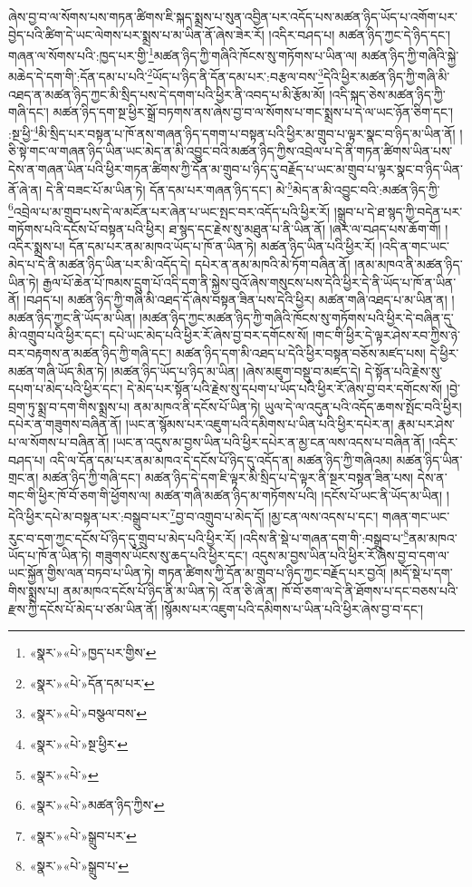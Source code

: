 ཞེས་བྱ་བ་ལ་སོགས་པས་གཏན་ཚིགས་ཇི་སྐད་སྨྲས་པ་སུན་འབྱིན་པར་འདོད་པས་མཚན་ཉིད་ཡོད་པ་འགོག་པར་བྱེད་པའི་ཚིག་དེ་ཡང་ལེགས་པར་སྨྲས་པ་མ་ཡིན་ནོ་ཞེས་ཟེར་རོ། །འདིར་བཤད་པ། མཚན་ཉིད་ཀྱང་དེ་ཉིད་དང་། གཞན་ལ་སོགས་པའི་:ཁྱད་པར་གྱི་\footnote{«སྣར་»«པེ་»ཁྱད་པར་གྱིས་}མཚན་ཉིད་ཀྱི་གཞིའི་ཁོངས་སུ་གཏོགས་པ་ཡིན་ལ། མཚན་ཉིད་ཀྱི་གཞིའི་སྐྱེ་མཆེད་དེ་དག་གི་:དོན་དམ་པ་པའི་\footnote{«སྣར་»«པེ་»དོན་དམ་པར་}ཡོད་པ་ཉིད་ནི་དོན་དམ་པར་:བརྩལ་བས་\footnote{«སྣར་»«པེ་»བསྩལ་བས་}དེའི་ཕྱིར་མཚན་ཉིད་ཀྱི་གཞི་མི་འཐད་ན་མཚན་ཉིད་ཀྱང་མི་སྲིད་པས་དེ་དགག་པའི་ཕྱིར་ནི་འབད་པ་མི་རྩོམ་མོ། །འདི་སྐད་ཅེས་མཚན་ཉིད་ཀྱི་གཞི་དང་། མཚན་ཉིད་དག་སྔ་ཕྱིར་སྒྲོ་བཏགས་ནས་ཞེས་བྱ་བ་ལ་སོགས་པ་གང་སྨྲས་པ་དེ་ལ་ཡང་ཉོན་ཅིག་དང་། :སྔ་ཕྱི་\footnote{«སྣར་»«པེ་»སྔ་ཕྱིར་}མི་སྲིད་པར་བསྟན་པ་ཁོ་ནས་གཞན་ཉིད་དགག་པ་བསྟན་པའི་ཕྱིར་མ་གྲུབ་པ་ལྟར་སྣང་བ་ཉིད་མ་ཡིན་ནོ། །ཅི་སྟེ་གང་ལ་གཞན་ཉིད་ཡིན་ཡང་མེད་ན་མི་འབྱུང་བའི་མཚན་ཉིད་ཀྱིས་འབྲེལ་པ་དེ་ནི་གཏན་ཚིགས་ཡིན་པས་དེས་ན་གཞན་ཡིན་པའི་ཕྱིར་གཏན་ཚིགས་ཀྱི་དོན་མ་གྲུབ་པ་ཉིད་དུ་བརྗོད་པ་ཡང་མ་གྲུབ་པ་ལྟར་སྣང་བ་ཉིད་ཡིན་ནོ་ཞེ་ན། དེ་ནི་བཟང་པོ་མ་ཡིན་ཏེ། དོན་དམ་པར་གཞན་ཉིད་དང་། མེ་\footnote{«སྣར་»«པེ་»}མེད་ན་མི་འབྱུང་བའི་:མཚན་ཉིད་ཀྱི་\footnote{«སྣར་»«པེ་»མཚན་ཉིད་ཀྱིས་}འབྲེལ་པ་མ་གྲུབ་པས་དེ་ལ་མངོན་པར་ཞེན་པ་ཡང་སྤང་བར་འདོད་པའི་ཕྱིར་རོ། །སྒྲུབ་པ་དེ་ཐ་སྙད་ཀྱི་བདེན་པར་གཏོགས་པའི་དངོས་པོ་བསྟན་པའི་ཕྱིར། ཐ་སྙད་དང་རྗེས་སུ་མཐུན་པ་ནི་ཡིན་ནོ། །ཞར་ལ་བཤད་པས་ཆོག་གོ། །འདིར་སྨྲས་པ། དོན་དམ་པར་ནམ་མཁའ་ཡོད་པ་ཁོ་ན་ཡིན་ཏེ། མཚན་ཉིད་ཡིན་པའི་ཕྱིར་རོ། །འདི་ན་གང་ཡང་མེད་པ་དེ་ནི་མཚན་ཉིད་ཡིན་པར་མི་འདོད་དེ། དཔེར་ན་ནམ་མཁའི་མེ་ཏོག་བཞིན་ནོ། །ནམ་མཁའ་ནི་མཚན་ཉིད་ཡིན་ཏེ། རྒྱལ་པོ་ཆེན་པོ་ཁམས་དྲུག་པོ་འདི་དག་ནི་སྐྱེས་བུའོ་ཞེས་གསུངས་པས་དེའི་ཕྱིར་དེ་ནི་ཡོད་པ་ཁོ་ན་ཡིན་ནོ། །བཤད་པ། མཚན་ཉིད་ཀྱི་གཞི་མི་འཐད་དོ་ཞེས་བསྟན་ཟིན་པས་དེའི་ཕྱིར། མཚན་གཞི་འཐད་པ་མ་ཡིན་ན། །མཚན་ཉིད་ཀྱང་ནི་ཡོད་མ་ཡིན། །མཚན་ཉིད་ཀྱང་མཚན་ཉིད་ཀྱི་གཞིའི་ཁོངས་སུ་གཏོགས་པའི་ཕྱིར་དེ་བཞིན་དུ་མི་འགྲུབ་པའི་ཕྱིར་དང་། དཔེ་ཡང་མེད་པའི་ཕྱིར་རོ་ཞེས་བྱ་བར་དགོངས་སོ། །གང་གི་ཕྱིར་དེ་ལྟར་ཤེས་རབ་ཀྱིས་ཉེ་བར་བརྟགས་ན་མཚན་ཉིད་ཀྱི་གཞི་དང་། མཚན་ཉིད་དག་མི་འཐད་པ་དེའི་ཕྱིར་བསྟན་བཅོས་མཛད་པས། དེ་ཕྱིར་མཚན་གཞི་ཡོད་མིན་ཏེ། །མཚན་ཉིད་ཡོད་པ་ཉིད་མ་ཡིན། །ཞེས་མཇུག་བསྡུ་བ་མཛད་དེ། དེ་སྟོན་པའི་རྗེས་སུ་དཔག་པ་མེད་པའི་ཕྱིར་དང་། དེ་མེད་པར་སྟོན་པའི་རྗེས་སུ་དཔག་པ་ཡོད་པའི་ཕྱིར་རོ་ཞེས་བྱ་བར་དགོངས་སོ། །བྱེ་བྲག་ཏུ་སྨྲ་བ་དག་གིས་སྨྲས་པ། ནམ་མཁའ་ནི་དངོས་པོ་ཡིན་ཏེ། ཡུལ་དེ་ལ་འདུན་པའི་འདོད་ཆགས་སྤོང་བའི་ཕྱིར། དཔེར་ན་གཟུགས་བཞིན་ནོ། །ཡང་ན་སྙོམས་པར་འཇུག་པའི་དམིགས་པ་ཡིན་པའི་ཕྱིར་དཔེར་ན། རྣམ་པར་ཤེས་པ་ལ་སོགས་པ་བཞིན་ནོ། །ཡང་ན་འདུས་མ་བྱས་ཡིན་པའི་ཕྱིར་དཔེར་ན་མྱ་ངན་ལས་འདས་པ་བཞིན་ནོ། །འདིར་བཤད་པ། འདི་ལ་དོན་དམ་པར་ནམ་མཁའ་དེ་དངོས་པོ་ཉིད་དུ་འདོད་ན། མཚན་ཉིད་ཀྱི་གཞིའམ། མཚན་ཉིད་ཡིན་གྲང་ན། མཚན་ཉིད་ཀྱི་གཞི་དང་། མཚན་ཉིད་དེ་དག་ཇི་ལྟར་མི་སྲིད་པ་དེ་ལྟར་ནི་སྔར་བསྟན་ཟིན་པས། དེས་ན་གང་གི་ཕྱིར་ཁོ་བོ་ཅག་གི་ཕྱོགས་ལ། མཚན་གཞི་མཚན་ཉིད་མ་གཏོགས་པའི། །དངོས་པོ་ཡང་ནི་ཡོད་མ་ཡིན། །དེའི་ཕྱིར་དཔེ་མ་བསྟན་པར་:བསྒྲུབ་པར་\footnote{«སྣར་»«པེ་»སྒྲུབ་པར་}བྱ་བ་འགྲུབ་པ་མེད་དོ། །མྱ་ངན་ལས་འདས་པ་དང་། གཞན་གང་ཡང་རུང་བ་དག་ཀྱང་དངོས་པོ་ཉིད་དུ་གྲུབ་པ་མེད་པའི་ཕྱིར་རོ། །འདིས་ནི་སྡེ་པ་གཞན་དག་གི་:བསྒྲུབ་པ་\footnote{«སྣར་»«པེ་»སྒྲུབ་པ་}ནམ་མཁའ་ཡོད་པ་ཁོ་ན་ཡིན་ཏེ། གཟུགས་ཡོངས་སུ་ཆད་པའི་ཕྱིར་དང་། འདུས་མ་བྱས་ཡིན་པའི་ཕྱིར་རོ་ཞེས་བྱ་བ་དག་ལ་ཡང་སྐྱོན་གྱིས་ལན་བཏབ་པ་ཡིན་ཏེ། གཏན་ཚིགས་ཀྱི་དོན་མ་གྲུབ་པ་ཉིད་ཀྱང་བརྗོད་པར་བྱའོ། །མདོ་སྡེ་པ་དག་གིས་སྨྲས་པ། ནམ་མཁའ་དངོས་པོ་ཉིད་ནི་མ་ཡིན་ཏེ། འོ་ན་ཅི་ཞེ་ན། ཁོ་བོ་ཅག་ལ་དེ་ནི་ཐོགས་པ་དང་བཅས་པའི་རྫས་ཀྱི་དངོས་པོ་མེད་པ་ཙམ་ཡིན་ནོ། །སྙོམས་པར་འཇུག་པའི་དམིགས་པ་ཡིན་པའི་ཕྱིར་ཞེས་བྱ་བ་དང་། 
